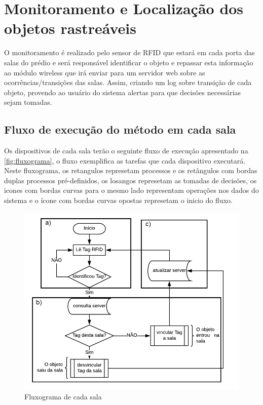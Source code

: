 \section{Monitoramento e Localização dos objetos rastreáveis}

O monitoramento é realizado pelo sensor de RFID que estará em cada porta das salas do prédio e será responsável 
identificar o objeto e repassar esta informação ao módulo wireless que irá enviar para um servidor web sobre as 
ocorrências/transições das salas. Assim, criando um log sobre transição de cada objeto, provendo ao usuário do sistema 
alertas para que decisões necessárias sejam tomadas.



\subsection{Fluxo de execução do método em cada sala}
Os dispositivos de cada sala terão o seguinte fluxo de execução apresentado na \autoref{fig:fluxograma}, 
o fluxo exemplifica as tarefas que cada dispositivo executará. Neste fluxograma, os retangulos represetam 
processos e os retângulos com bordas duplas processos pré-definidos, os losangos represetam as tomadas de decisões, 
os icones com bordas curvas para o mesmo lado representam operações nos dados do sistema e o ícone com bordas curvas 
opostas represetam o inicio do fluxo.

\begin{figure}[H]
              \caption{\label{fig:fluxograma}{Fluxograma de cada sala}}
              \centering
              \includegraphics[width=1\textwidth]{Figuras/fluxograma.png}
\end{figure}

